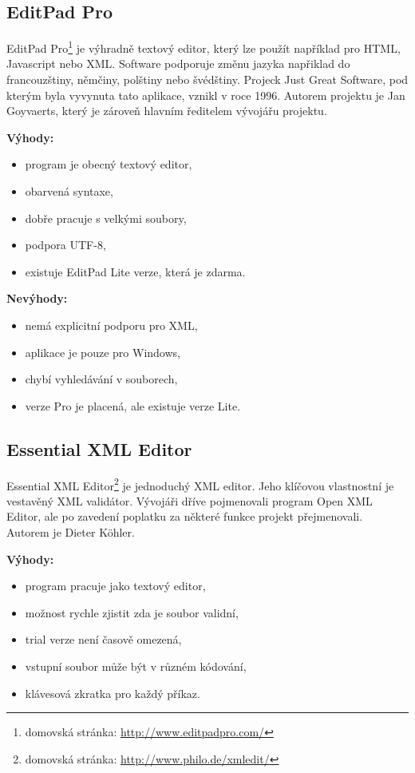         \subsection{EditPad Pro}
            EditPad Pro\footnote{domovská stránka: \url{http://www.editpadpro.com/}} je výhradně textový editor, který lze použít například pro HTML, Javascript nebo XML. Software podporuje změnu jazyka napřiklad do francouzštiny, němčiny, polštiny nebo švédštiny. Projeck Just Great Software, pod kterým byla vyvynuta tato aplikace, vznikl v roce 1996. Autorem projektu je Jan Goyvaerts, který je zároveň hlavním ředitelem vývojářu projektu.

            \textbf{Výhody:}
                \begin{itemize}
                    \item program je obecný textový editor,
                    \item obarvená syntaxe,
                    \item dobře pracuje s velkými soubory,
                    \item podpora UTF-8,
                    \item existuje EditPad Lite verze, která je zdarma.
                \end{itemize}
                
            \textbf{Nevýhody:}
                \begin{itemize}
                    \item nemá explicitní podporu pro XML,
                    \item aplikace je pouze pro Windows,
                    \item chybí vyhledávání v souborech,
                    \item verze Pro je placená, ale existuje verze Lite.
                \end{itemize}
                
        \subsection{Essential XML Editor}
            Essential XML Editor\footnote{domovská stránka: \url{http://www.philo.de/xmledit/}} je jednoduchý XML editor. Jeho klíčovou vlastnostní je vestavěný XML validátor. Vývojáři dříve pojmenovali program Open XML Editor, ale po zavedení poplatku za některé funkce projekt přejmenovali. Autorem je Dieter Köhler. 
            
            \textbf{Výhody:}
                \begin{itemize}
                    \item program pracuje jako textový editor,
                    \item možnost rychle zjistit zda je soubor validní,
                    \item trial verze není časově omezená,
                    \item vstupní soubor může být v různém kódování,
                    \item klávesová zkratka pro každý příkaz.
                \end{itemize}
                
